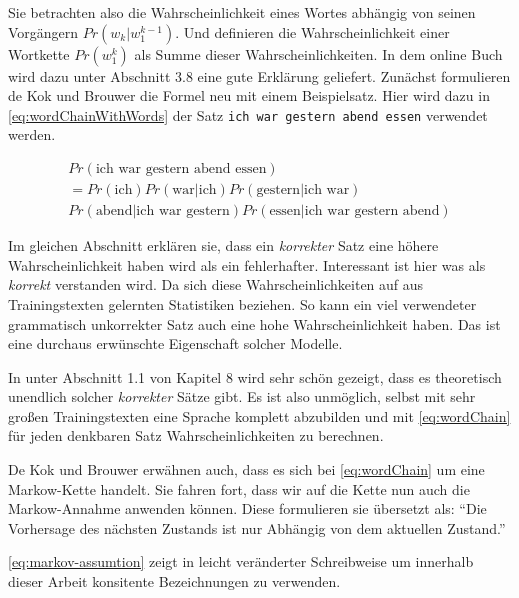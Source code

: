         Sie betrachten also die Wahrscheinlichkeit eines Wortes abhängig von seinen Vorgängern \(Pr(w_k|w_1^{k-1})\). Und definieren die Wahrscheinlichkeit einer Wortkette \(Pr(w_1^k)\) als Summe dieser Wahrscheinlichkeiten. In dem online Buch \parencite{nlwp:book} wird dazu unter Abschnitt 3.8 eine gute Erklärung geliefert. Zunächst formulieren de Kok und Brouwer die Formel neu mit einem Beispielsatz. Hier wird dazu in \autoref{eq:wordChainWithWords} der Satz \texttt{ich war gestern abend essen} verwendet werden.
        
        \begin{equation}
        	\begin{split}
        		Pr(\text{ich war gestern abend essen}) \\
                = Pr(\text{ich}) Pr(\text{war}|\text{ich}) Pr(\text{gestern}|\text{ich war}) \\
                Pr(\text{abend}|\text{ich war gestern}) Pr(\text{essen}|\text{ich war gestern abend}) 
            \end{split}
            \label{eq:wordChainWithWords}
        \end{equation}
        
        Im gleichen Abschnitt erklären sie, dass ein \emph{korrekter} Satz eine höhere Wahrscheinlichkeit haben wird als ein fehlerhafter. Interessant ist hier was als \emph{korrekt} verstanden wird. Da sich diese Wahrscheinlichkeiten auf aus Trainingstexten gelernten Statistiken beziehen. So kann ein viel verwendeter grammatisch unkorrekter Satz auch eine hohe Wahrscheinlichkeit haben. Das ist eine durchaus erwünschte Eigenschaft solcher Modelle.
        
        In \parencite{nltk:book} unter Abschnitt 1.1 von Kapitel 8 wird sehr schön gezeigt, dass es theoretisch unendlich solcher \emph{korrekter} Sätze gibt. Es ist also unmöglich, selbst mit sehr großen Trainingstexten eine Sprache komplett abzubilden und mit \autoref{eq:wordChain} für jeden denkbaren Satz Wahrscheinlichkeiten zu berechnen. 
        
        De Kok und Brouwer erwähnen auch, dass es sich bei \autoref{eq:wordChain} um eine Markow-Kette handelt. Sie fahren fort, dass wir auf die Kette nun auch die Markow-Annahme anwenden können. Diese formulieren sie übersetzt als: \enquote{Die Vorhersage des nächsten Zustands ist nur Abhängig von dem aktuellen Zustand.}\parencite[Abs.  3.8]{nlwp:book}
        
        \autoref{eq:markov-assumtion} zeigt \parencite[Abs.  3.8, Gleichung 3.8]{nlwp:book} in leicht veränderter Schreibweise um innerhalb dieser Arbeit konsitente Bezeichnungen zu verwenden.  
        

